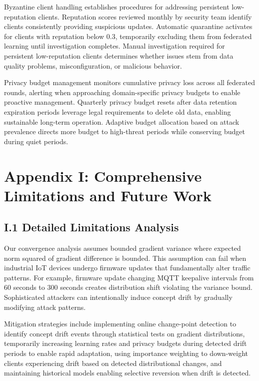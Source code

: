 \documentclass[12pt,a4paper]{article}
\theoremstyle{definition}
\begin{document}
Byzantine client handling establishes procedures for addressing persistent low-reputation clients. Reputation scores reviewed monthly by security team identify clients consistently providing suspicious updates. Automatic quarantine activates for clients with reputation below $0.3$, temporarily excluding them from federated learning until investigation completes. Manual investigation required for persistent low-reputation clients determines whether issues stem from data quality problems, misconfiguration, or malicious behavior.

Privacy budget management monitors cumulative privacy loss across all federated rounds, alerting when approaching domain-specific privacy budgets to enable proactive management. Quarterly privacy budget resets after data retention expiration periods leverage legal requirements to delete old data, enabling sustainable long-term operation. Adaptive budget allocation based on attack prevalence directs more budget to high-threat periods while conserving budget during quiet periods.

\section{Appendix I: Comprehensive Limitations and Future Work}

\subsection{I.1 Detailed Limitations Analysis}

Our convergence analysis assumes bounded gradient variance where expected norm squared of gradient difference is bounded. This assumption can fail when industrial IoT devices undergo firmware updates that fundamentally alter traffic patterns. For example, firmware update changing MQTT keepalive intervals from 60 seconds to 300 seconds creates distribution shift violating the variance bound. Sophisticated attackers can intentionally induce concept drift by gradually modifying attack patterns.

Mitigation strategies include implementing online change-point detection to identify concept drift events through statistical tests on gradient distributions, temporarily increasing learning rates and privacy budgets during detected drift periods to enable rapid adaptation, using importance weighting to down-weight clients experiencing drift based on detected distributional changes, and maintaining historical models enabling selective reversion when drift is detected.
\end{document}
